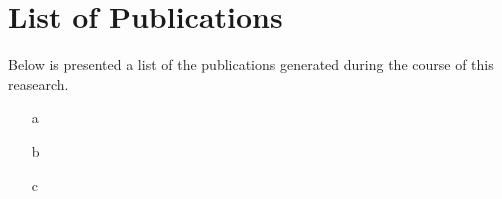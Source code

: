 \chapter*{List of Publications}
\label{ch: Publications}

Below is presented a list of the publications generated during the course of this reasearch.

\begin{itemize}
	\item[a]
	\item[b]
	\item[c]
\end{itemize}